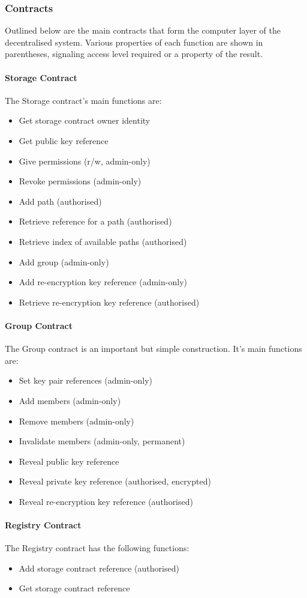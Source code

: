 \subsubsection{Contracts}

Outlined below are the main contracts that form the computer layer of the decentralised system. Various properties of each function are shown in parentheses, signaling access level required or a property of the result.

\paragraph{Storage Contract}

The Storage contract's main functions are:

\begin{itemize}
  \item Get storage contract owner identity
  \item Get public key reference
  \item Give permissions (r/w, admin-only)
  \item Revoke permissions (admin-only)
  \item Add path (authorised)
  \item Retrieve reference for a path (authorised)
  \item Retrieve index of available paths (authorised)
  \item Add group (admin-only)
  \item Add re-encryption key reference (admin-only)
  \item Retrieve re-encryption key reference (authorised)
\end{itemize}

\paragraph{Group Contract}

The Group contract is an important but simple construction. It's main functions are:

\begin{itemize}
  \item Set key pair references (admin-only)
  \item Add members (admin-only)
  \item Remove members (admin-only)
  \item Invalidate members (admin-only, permanent)
  \item Reveal public key reference
  \item Reveal private key reference (authorised, encrypted)
  \item Reveal re-encryption key reference (authorised)
\end{itemize}

\paragraph{Registry Contract}

The Registry contract has the following functions:

\begin{itemize}
  \item Add storage contract reference (authorised)
  \item Get storage contract reference
\end{itemize}
